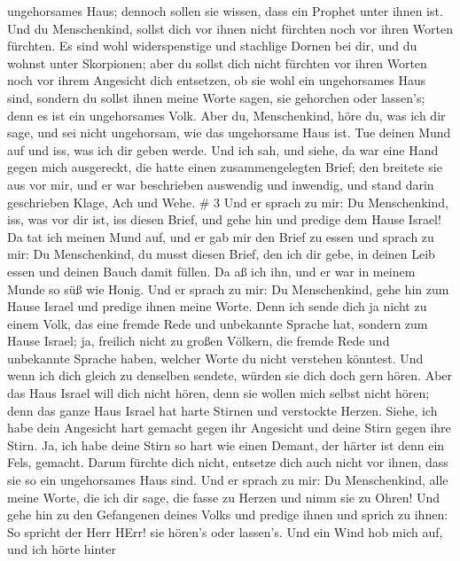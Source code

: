 ungehorsames Haus; dennoch sollen sie wissen, dass ein Prophet unter
ihnen ist.  Und du Menschenkind, sollst dich vor ihnen nicht
fürchten noch vor ihren Worten fürchten. Es sind wohl widerspenstige und
stachlige Dornen bei dir, und du wohnst unter Skorpionen; aber du sollst
dich nicht fürchten vor ihren Worten noch vor ihrem Angesicht dich
entsetzen, ob sie wohl ein ungehorsames Haus sind,  sondern
du sollst ihnen meine Worte sagen, sie gehorchen oder lassen's; denn es
ist ein ungehorsames Volk.  Aber du, Menschenkind, höre du,
was ich dir sage, und sei nicht ungehorsam, wie das ungehorsame Haus
ist. Tue deinen Mund auf und iss, was ich dir geben werde. 
Und ich sah, und siehe, da war eine Hand gegen mich ausgereckt, die
hatte einen zusammengelegten Brief;  den breitete sie aus
vor mir, und er war beschrieben auswendig und inwendig, und stand darin
geschrieben Klage, Ach und Wehe. \# 3  Und er sprach zu mir:
Du Menschenkind, iss, was vor dir ist, iss diesen Brief, und gehe hin
und predige dem Hause Israel!  Da tat ich meinen Mund auf,
und er gab mir den Brief zu essen  und sprach zu mir: Du
Menschenkind, du musst diesen Brief, den ich dir gebe, in deinen Leib
essen und deinen Bauch damit füllen. Da aß ich ihn, und er war in meinem
Munde so süß wie Honig.  Und er sprach zu mir: Du
Menschenkind, gehe hin zum Hause Israel und predige ihnen meine Worte.
 Denn ich sende dich ja nicht zu einem Volk, das eine fremde
Rede und unbekannte Sprache hat, sondern zum Hause Israel; 
ja, freilich nicht zu großen Völkern, die fremde Rede und unbekannte
Sprache haben, welcher Worte du nicht verstehen könntest. Und wenn ich
dich gleich zu denselben sendete, würden sie dich doch gern hören.
 Aber das Haus Israel will dich nicht hören, denn sie wollen
mich selbst nicht hören; denn das ganze Haus Israel hat harte Stirnen
und verstockte Herzen.  Siehe, ich habe dein Angesicht hart
gemacht gegen ihr Angesicht und deine Stirn gegen ihre Stirn.
 Ja, ich habe deine Stirn so hart wie einen Demant, der
härter ist denn ein Fels, gemacht. Darum fürchte dich nicht, entsetze
dich auch nicht vor ihnen, dass sie so ein ungehorsames Haus sind.
 Und er sprach zu mir: Du Menschenkind, alle meine Worte,
die ich dir sage, die fasse zu Herzen und nimm sie zu Ohren!
 Und gehe hin zu den Gefangenen deines Volks und predige
ihnen und sprich zu ihnen: So spricht der Herr HErr! sie hören's oder
lassen's.  Und ein Wind hob mich auf, und ich hörte hinter

